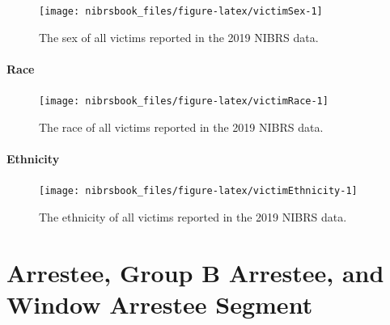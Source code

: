 \documentclass[
  12pt,
  openany]{book}
\begin{document}
\begin{figure}

{\centering \texttt{[image: nibrsbook\_files/figure-latex/victimSex-1]} 

}

\caption{The sex of all victims reported in the 2019 NIBRS data.}\label{fig:victimSex}
\end{figure}

\hypertarget{race-1}{%
\subsubsection{Race}\label{race-1}}

\begin{figure}

{\centering \texttt{[image: nibrsbook\_files/figure-latex/victimRace-1]} 

}

\caption{The race of all victims reported in the 2019 NIBRS data.}\label{fig:victimRace}
\end{figure}

\hypertarget{ethnicity}{%
\subsubsection{Ethnicity}\label{ethnicity}}

\begin{figure}

{\centering \texttt{[image: nibrsbook\_files/figure-latex/victimEthnicity-1]} 

}

\caption{The ethnicity of all victims reported in the 2019 NIBRS data.}\label{fig:victimEthnicity}
\end{figure}

\hypertarget{arrestee}{%
\chapter{Arrestee, Group B Arrestee, and Window Arrestee Segment}\label{arrestee}}
\end{document}
